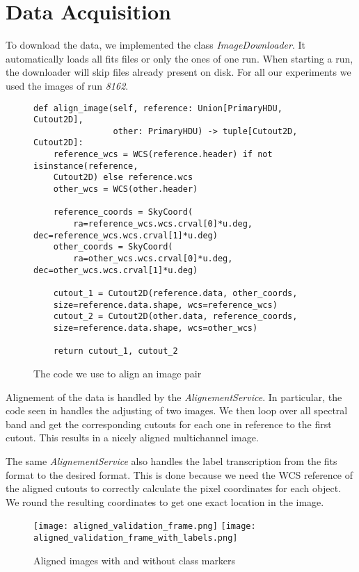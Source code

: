 \section{Data Acquisition}
To download the data, we implemented the class \emph{ImageDownloader}. It automatically loads all fits files or only the ones of one run. When starting a run, the downloader will skip files already present on disk.
For all our experiments we used the images of run \emph{8162}.

\begin{figure}
    \begin{verbatim}
def align_image(self, reference: Union[PrimaryHDU, Cutout2D],
                other: PrimaryHDU) -> tuple[Cutout2D, Cutout2D]:
    reference_wcs = WCS(reference.header) if not isinstance(reference,
    Cutout2D) else reference.wcs
    other_wcs = WCS(other.header)

    reference_coords = SkyCoord(
        ra=reference_wcs.wcs.crval[0]*u.deg, dec=reference_wcs.wcs.crval[1]*u.deg)
    other_coords = SkyCoord(
        ra=other_wcs.wcs.crval[0]*u.deg, dec=other_wcs.wcs.crval[1]*u.deg)
            
    cutout_1 = Cutout2D(reference.data, other_coords,
    size=reference.data.shape, wcs=reference_wcs)
    cutout_2 = Cutout2D(other.data, reference_coords,
    size=reference.data.shape, wcs=other_wcs)
            
    return cutout_1, cutout_2
        \end{verbatim}
    \label{alignementCode}
    \caption{The code we use to align an image pair}
\end{figure}

Alignement of the data is handled by the \emph{AlignementService}. In particular, the code seen in  handles the adjusting of two images. We then loop over all spectral band and get the corresponding cutouts for each one in reference to the first cutout. This results in a nicely aligned multichannel image.

The same \emph{AlignementService} also handles the label transcription from the fits format to the desired format. This is done because we need the WCS reference of the aligned cutouts to correctly calculate the pixel coordinates for each object.
We round the resulting coordinates to get one exact location in the image.

\begin{figure}
    \texttt{[image: aligned\_validation\_frame.png]}
    \texttt{[image: aligned\_validation\_frame\_with\_labels.png]}
    \caption{Aligned images with and without class markers}
    \label{alignedImages}
\end{figure}

